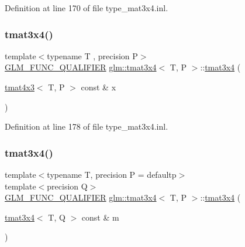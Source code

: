 Definition at line 170 of file type\+\_\+mat3x4.\+inl.

\mbox{\label{structglm_1_1tmat3x4_aadf667324b7352d8aadc7bf0680164e1}} 
\subsubsection{\texorpdfstring{tmat3x4()}{tmat3x4()}\hspace{0.1cm}{\footnotesize\ttfamily [18/22]}}
{\footnotesize\ttfamily template$<$typename T , precision P$>$ \\
\mbox{\hyperlink{setup_8hpp_a33fdea6f91c5f834105f7415e2a64407}{G\+L\+M\+\_\+\+F\+U\+N\+C\+\_\+\+Q\+U\+A\+L\+I\+F\+I\+ER}} \mbox{\hyperlink{structglm_1_1tmat3x4}{glm\+::tmat3x4}}$<$ T, P $>$\+::\mbox{\hyperlink{structglm_1_1tmat3x4}{tmat3x4}} (\begin{DoxyParamCaption}\item[{\mbox{\hyperlink{structglm_1_1tmat4x3}{tmat4x3}}$<$ T, P $>$ const \&}]{x }\end{DoxyParamCaption})}



Definition at line 178 of file type\+\_\+mat3x4.\+inl.

\mbox{\label{structglm_1_1tmat3x4_a2f48d00df66c48b9d37f53aed6bcdec7}} 
\subsubsection{\texorpdfstring{tmat3x4()}{tmat3x4()}\hspace{0.1cm}{\footnotesize\ttfamily [19/22]}}
{\footnotesize\ttfamily template$<$typename T, precision P = defaultp$>$ \\
template$<$precision Q$>$ \\
\mbox{\hyperlink{setup_8hpp_a33fdea6f91c5f834105f7415e2a64407}{G\+L\+M\+\_\+\+F\+U\+N\+C\+\_\+\+Q\+U\+A\+L\+I\+F\+I\+ER}} \mbox{\hyperlink{structglm_1_1tmat3x4}{glm\+::tmat3x4}}$<$ T, P $>$\+::\mbox{\hyperlink{structglm_1_1tmat3x4}{tmat3x4}} (\begin{DoxyParamCaption}\item[{\mbox{\hyperlink{structglm_1_1tmat3x4}{tmat3x4}}$<$ T, Q $>$ const \&}]{m }\end{DoxyParamCaption})}



